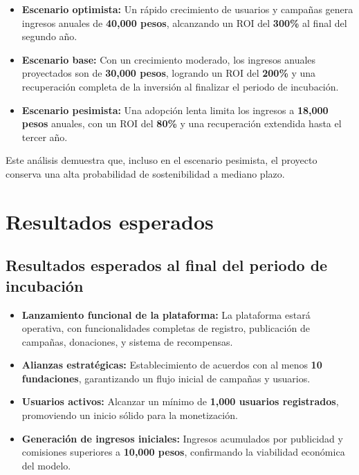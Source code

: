 \documentclass[a4paper,12pt]{article}
\begin{document}
\begin{itemize}\setlength{\itemsep}{0pt}\setlength{\parskip}{1pt}
    \item \textbf{Escenario optimista:} Un rápido crecimiento de usuarios y campañas genera ingresos anuales de \textbf{40,000 pesos}, alcanzando un ROI del \textbf{300\%} al final del segundo año.
    \item \textbf{Escenario base:} Con un crecimiento moderado, los ingresos anuales proyectados son de \textbf{30,000 pesos}, logrando un ROI del \textbf{200\%} y una recuperación completa de la inversión al finalizar el periodo de incubación.
    \item \textbf{Escenario pesimista:} Una adopción lenta limita los ingresos a \textbf{18,000 pesos} anuales, con un ROI del \textbf{80\%} y una recuperación extendida hasta el tercer año.
\end{itemize}

Este análisis demuestra que, incluso en el escenario pesimista, el proyecto conserva una alta probabilidad de sostenibilidad a mediano plazo.

\section{Resultados esperados}
\subsection{Resultados esperados al final del periodo de incubación}
\begin{itemize}\setlength{\itemsep}{0pt}\setlength{\parskip}{1pt}
    \item \textbf{Lanzamiento funcional de la plataforma:} La plataforma estará operativa, con funcionalidades completas de registro, publicación de campañas, donaciones, y sistema de recompensas.
    \item \textbf{Alianzas estratégicas:} Establecimiento de acuerdos con al menos \textbf{10 fundaciones}, garantizando un flujo inicial de campañas y usuarios.
    \item \textbf{Usuarios activos:} Alcanzar un mínimo de \textbf{1,000 usuarios registrados}, promoviendo un inicio sólido para la monetización.
    \item \textbf{Generación de ingresos iniciales:} Ingresos acumulados por publicidad y comisiones superiores a \textbf{10,000 pesos}, confirmando la viabilidad económica del modelo.
\end{itemize}
\end{document}
